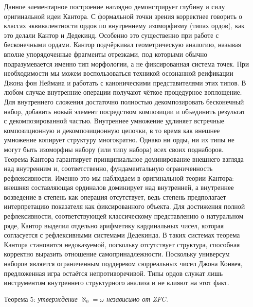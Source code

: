 \documentclass[12pt]{article}
\begin{document}
Данное элементарное построение наглядно демонстрирует глубину и силу оригинальной идеи Кантора. С формальной точки зрения корректнее говорить о классах эквивалентности ордов по внутреннему изоморфизму (типах ордов), как это делали Кантор и Дедекинд. Особенно это существенно при работе с бесконечными ордами. Кантор подчёркивал геометрическую аналогию, называя вполне упорядоченные фрагменты отрезками, под которыми обычно подразумевается именно тип морфологии, а не фиксированная система точек. При необходимости мы можем воспользоваться техникой осознанной реификации Джона фон Неймана и работать с каноническими представителями этих типов. В любом случае внутренние операции получают чёткое процедурное воплощение. Для внутреннего сложения достаточно полностью декомпозировать бесконечный набор, добавить новый элемент посредством композиции и объединить результат с декомпозированной частью. Внутреннее умножение удлиняет встречные композиционную и декомпозиционную цепочки, в то время как внешнее умножение копирует структуру многократно. Однако ни орды, ни их типы не могут быть изоморфны набору (или типу набора) всех своих поднаборов. Теорема Кантора гарантирует принципиальное доминирование внешнего взгляда над внутренним и, соответственно, фундаментальную ограниченность рефлексивности. Именно это мы наблюдаем в оригинальной теории Кантора: внешняя составляющая ординалов доминирует над внутренней, а внутреннее возведение в степень как операция отсутствует, ведь степень предполагает интерпретацию показателя как фиксированного объекта. Для достижения полной рефлексивности, соответствующей классическому представлению о натуральном ряде, Кантор выделил отдельно арифметику кардинальных чисел, которая согласуется с рефлексивными системами Дедекинда. В таких системах теорема Кантора становится недоказуемой, поскольку отсутствует структура, способная корректно выразить отношение самопринадлежности. Поскольку универсум наборов является ограниченным поддеревом сюрреальных чисел Джона Конвея, предложенная игра остаётся непротиворечивой. Типы ордов служат лишь инструментом внутреннего структурного анализа и не влияют на этот факт.

Теорема 5: {\it утверждение $\aleph_0 = \omega$ независимо от ZFC.}
\end{document}

